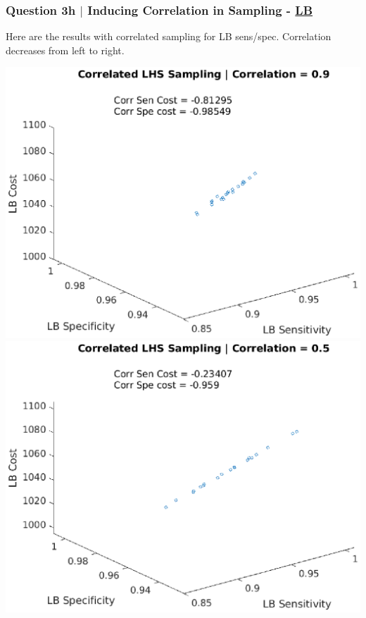 \documentclass[aspectratio=1610]{beamer}
\begin{document}
\begin{frame}
\frametitle{Question 3h $|$ Inducing Correlation in Sampling - \underline{LB}}

Here are the results with correlated sampling for LB sens/spec. Correlation decreases from left to right.

\vspace{1em}
\centering                                                         
\includegraphics[scale = .3]{lbcorr1}
\includegraphics[scale = .3]{lbcorr2}

\end{frame}
\end{document}
